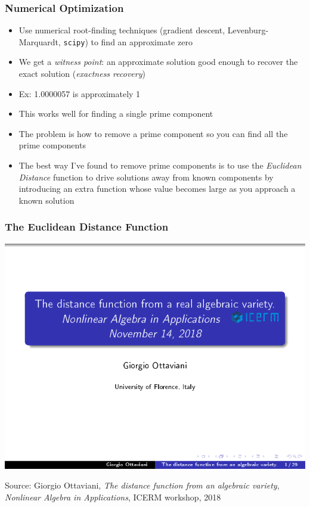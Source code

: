 \documentclass{beamer}
\begin{document}
\begin{frame}
\frametitle{Numerical Optimization}
\begin{itemize}
\item Use numerical root-finding techniques (gradient descent, Levenburg-Marquardt, {\tt scipy}) to find an approximate zero
\item We get a {\it witness point}: an approximate solution good enough to recover the exact solution ({\it exactness recovery})
\item Ex: 1.0000057 is approximately 1
\item This works well for finding a single prime component
\item The problem is how to remove a prime component so you can find all the prime components
\item The best way I've found to remove prime components is to use the {\it Euclidean Distance} function
to drive solutions away from known components by introducing an extra function whose value becomes large
as you approach a known solution
\end{itemize}
\end{frame}

\begin{frame}
\frametitle{The Euclidean Distance Function}
\includegraphics[page=3, clip, trim=0in 1in 0in 0in, width=\textwidth]{The_distance_function_from_a_real_algebraic_variety_]_Giorgio_Ottaviani,_University_of_Florence.pdf}
\begin{block}{}
Source: Giorgio Ottaviani, {\it The distance function from an algebraic variety}, {\it Nonlinear Algebra in Applications}, ICERM workshop, 2018
\end{block}
\end{frame}
\end{document}
